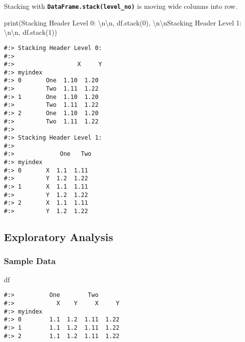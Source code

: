 \documentclass[
]{book}
\newenvironment{Shaded}{\begin{snugshade}}{\end{snugshade}}
\newcommand{\BuiltInTok}[1]{#1}
\newcommand{\CharTok}[1]{\textcolor[rgb]{0.5,0.5,0.5}{#1}}
\newcommand{\DecValTok}[1]{\textcolor[rgb]{0.06,0.06,0.06}{#1}}
\newcommand{\NormalTok}[1]{#1}
\newcommand{\StringTok}[1]{\textcolor[rgb]{0.5,0.5,0.5}{#1}}
\begin{document}
Stacking with \textbf{\texttt{DataFrame.stack(level\_no)}} is moving wide columns into row.

\begin{Shaded}
\begin{Highlighting}[]
\BuiltInTok{print}\NormalTok{(}\StringTok{\textquotesingle{}Stacking Header Level 0: }\CharTok{\textbackslash{}n\textbackslash{}n}\StringTok{\textquotesingle{}}\NormalTok{, df.stack(}\DecValTok{0}\NormalTok{),}
      \StringTok{\textquotesingle{}}\CharTok{\textbackslash{}n\textbackslash{}n}\StringTok{Stacking Header Level 1: }\CharTok{\textbackslash{}n\textbackslash{}n}\StringTok{\textquotesingle{}}\NormalTok{, df.stack(}\DecValTok{1}\NormalTok{))}
\end{Highlighting}
\end{Shaded}

\begin{verbatim}
#:> Stacking Header Level 0: 
#:> 
#:>                  X     Y
#:> myindex                
#:> 0       One  1.10  1.20
#:>         Two  1.11  1.22
#:> 1       One  1.10  1.20
#:>         Two  1.11  1.22
#:> 2       One  1.10  1.20
#:>         Two  1.11  1.22 
#:> 
#:> Stacking Header Level 1: 
#:> 
#:>             One   Two
#:> myindex             
#:> 0       X  1.1  1.11
#:>         Y  1.2  1.22
#:> 1       X  1.1  1.11
#:>         Y  1.2  1.22
#:> 2       X  1.1  1.11
#:>         Y  1.2  1.22
\end{verbatim}

\hypertarget{exploratory-analysis}{%
\subsection{Exploratory Analysis}\label{exploratory-analysis}}

\hypertarget{sample-data-12}{%
\subsubsection{Sample Data}\label{sample-data-12}}

\begin{Shaded}
\begin{Highlighting}[]
\NormalTok{df}
\end{Highlighting}
\end{Shaded}

\begin{verbatim}
#:>          One        Two      
#:>            X    Y     X     Y
#:> myindex                      
#:> 0        1.1  1.2  1.11  1.22
#:> 1        1.1  1.2  1.11  1.22
#:> 2        1.1  1.2  1.11  1.22
\end{verbatim}
\end{document}
